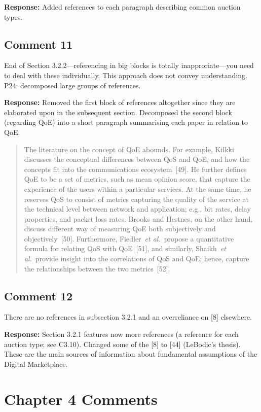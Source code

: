 \documentclass[10pt,a4paper,notitlepage]{article}
\numberwithin{equation}{section}
\begin{document}
\textbf{Response:}
Added references to each paragraph describing common auction types.

\subsection{Comment 11}
End of Section 3.2.2---referencing in big blocks is totally inapproriate---you need to deal with these individually. This approach does not convey understanding. P24: decomposed large groups of references.

\textbf{Response:}
Removed the first block of references altogether since they are elaborated upon in the subsequent section. Decomposed the second block (regarding QoE) into a short paragraph summarising each paper in relation to QoE.
\begin{quote}
The literature on the concept of QoE abounds. For example, Kilkki discusses the conceptual differences between QoS and QoE, and how the concepts fit into the communications ecosystem~[49]. He further defines QoE to be a set of metrics, such as mean opinion score, that capture the experience of the users within a particular services. At the same time, he reserves QoS to consist of metrics capturing the quality of the service at the technical level between network and application; e.g., bit rates, delay properties, and packet loss rates. Brooks and Hestnes, on the other hand, discuss different way of measuring QoE both subjectively and objectively~[50]. Furthermore, Fiedler~\emph{et al.}~propose a quantitative formula for relating QoS with QoE~[51], and similarly, Shaikh~\emph{et al.}~provide insight into the correlations of QoS and QoE; hence, capture the relationships between the two metrics~[52].
\end{quote}

\subsection{Comment 12}
There are no references in subsection 3.2.1 and an overreliance on [8] elsewhere.

\textbf{Response:}
Section 3.2.1 features now more references (a reference for each auction type; see C3.10). Changed some of the [8] to [44] (LeBodic's thesis). These are the main sources of information about fundamental assumptions of the Digital Marketplace.

\clearpage

\section{Chapter 4 Comments}
\end{document}
